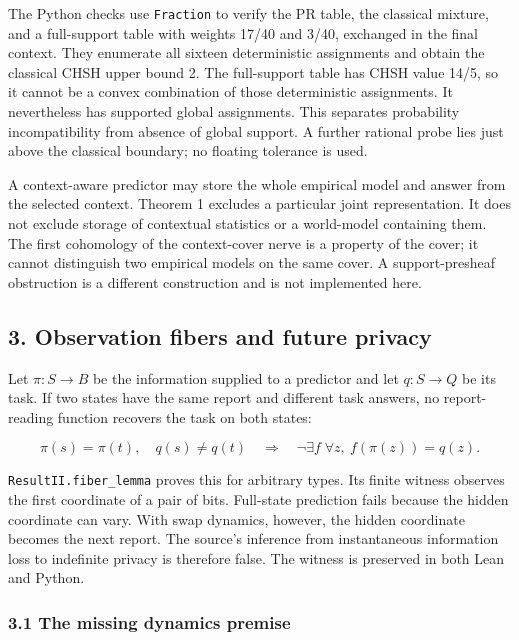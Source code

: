 \documentclass[
  10pt,
]{article}
\begin{document}
The Python checks use \texttt{Fraction} to verify the PR table, the classical mixture, and a full-support table with weights 17/40 and 3/40, exchanged in the final context. They enumerate all sixteen deterministic assignments and obtain the classical CHSH upper bound 2. The full-support table has CHSH value 14/5, so it cannot be a convex combination of those deterministic assignments. It nevertheless has supported global assignments. This separates probability incompatibility from absence of global support. A further rational probe lies just above the classical boundary; no floating tolerance is used.

A context-aware predictor may store the whole empirical model and answer from the selected context. Theorem 1 excludes a particular joint representation. It does not exclude storage of contextual statistics or a world-model containing them. The first cohomology of the context-cover nerve is a property of the cover; it cannot distinguish two empirical models on the same cover. A support-presheaf obstruction is a different construction and is not implemented here.

\subsection{3. Observation fibers and future privacy}\label{observation-fibers-and-future-privacy}

Let \protect\hypertarget{math-E0012-0021}{}{\(\pi:S\to B\)} be the information supplied to a predictor and let \protect\hypertarget{math-E0013-0022}{}{\(q:S\to Q\)} be its task. If two states have the same report and different task answers, no report-reading function recovers the task on both states:

\protect\hypertarget{math-E0014-0023}{}{\[
\pi(s)=\pi(t),\quad q(s)\ne q(t)
\quad\Longrightarrow\quad
\neg\exists f\;\forall z,\ f(\pi(z))=q(z).
\]}

\texttt{ResultII.fiber\_lemma} proves this for arbitrary types. Its finite witness observes the first coordinate of a pair of bits. Full-state prediction fails because the hidden coordinate can vary. With swap dynamics, however, the hidden coordinate becomes the next report. The source's inference from instantaneous information loss to indefinite privacy is therefore false. The witness is preserved in both Lean and Python.

\subsubsection{3.1 The missing dynamics premise}\label{the-missing-dynamics-premise}
\end{document}
